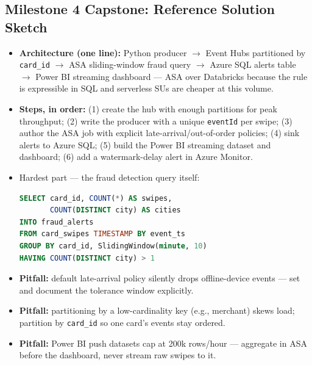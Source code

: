 \documentclass[11pt, a4paper]{article}
\begin{document}
\subsection*{Milestone 4 Capstone: Reference Solution Sketch}
\begin{itemize}[label=-, itemsep=1pt]
    \item \textbf{Architecture (one line):} Python producer $\rightarrow$ Event Hubs partitioned by \texttt{card\_id} $\rightarrow$ ASA sliding-window fraud query $\rightarrow$ Azure SQL alerts table $\rightarrow$ Power BI streaming dashboard --- ASA over Databricks because the rule is expressible in SQL and serverless SUs are cheaper at this volume.
    \item \textbf{Steps, in order:} (1) create the hub with enough partitions for peak throughput; (2) write the producer with a unique \texttt{eventId} per swipe; (3) author the ASA job with explicit late-arrival/out-of-order policies; (4) sink alerts to Azure SQL; (5) build the Power BI streaming dataset and dashboard; (6) add a watermark-delay alert in Azure Monitor.
    \item Hardest part --- the fraud detection query itself:
\begin{lstlisting}[language=SQL]
SELECT card_id, COUNT(*) AS swipes,
       COUNT(DISTINCT city) AS cities
INTO fraud_alerts
FROM card_swipes TIMESTAMP BY event_ts
GROUP BY card_id, SlidingWindow(minute, 10)
HAVING COUNT(DISTINCT city) > 1
\end{lstlisting}
    \item \textbf{Pitfall:} default late-arrival policy silently drops offline-device events --- set and document the tolerance window explicitly.
    \item \textbf{Pitfall:} partitioning by a low-cardinality key (e.g., merchant) skews load; partition by \texttt{card\_id} so one card's events stay ordered.
    \item \textbf{Pitfall:} Power BI push datasets cap at 200k rows/hour --- aggregate in ASA before the dashboard, never stream raw swipes to it.
\end{itemize}
\end{document}
